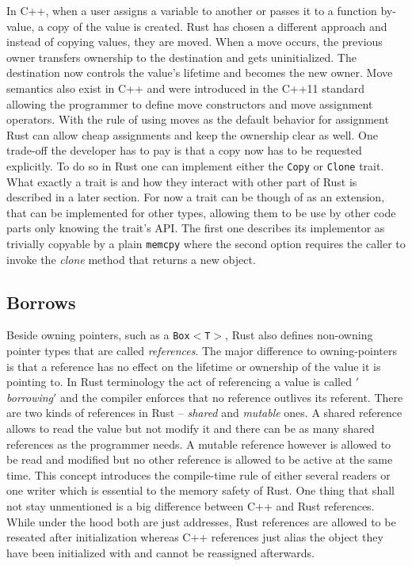 In C++, when a user assigns a variable to another or passes it to a function by-value, a copy of the value is created. Rust has chosen a different approach and instead of copying values, they are moved. When a move occurs,  the previous owner transfers ownership to the destination and gets uninitialized. The destination now controls the value's lifetime and becomes the new owner. Move semantics also exist in C++ and were introduced in the C++11 standard allowing the programmer to define move constructors and move assignment operators. \cite{CppMove} With the rule of using moves as the default behavior for assignment Rust can allow cheap assignments and keep the ownership clear as well. One trade-off the developer has to pay is that a copy now has to be requested explicitly. To do so in Rust one can implement either the \texttt{Copy} or \texttt{Clone} trait. What exactly a trait is and how they interact with other part of Rust is described in a later section. For now a trait can be though of as an extension, that can be implemented for other types, allowing them to be use by other code parts only knowing the trait's \ac{API}. The first one describes its implementor as trivially copyable by a plain \texttt{memcpy} where the second option requires the caller to invoke the \textit{clone} method that returns a new object. \cite[Chapter 4. Ownership]{ProgrammingRust}

\subsection{Borrows}

Beside owning pointers, such as a \texttt{Box$<$T$>$}, Rust also defines non-owning pointer types that are called \textit{references}. The major difference to owning-pointers is that a reference has no effect on the lifetime or ownership of the value it is pointing to. In Rust terminology the act of referencing a value is called \textit{$'$borrowing$'$} and the compiler enforces that no reference outlives its referent. There are two kinds of references in Rust -- \textit{shared} and \textit{mutable} ones. A shared reference allows to read the value but not modify it and there can be as many shared references as the programmer needs. A mutable reference however is allowed to be read and modified but no other reference is allowed to be active at the same time. This concept introduces the compile-time rule of either several readers or one writer which is essential to the memory safety of Rust. One thing that shall not stay unmentioned is a big difference between C++ and Rust references. While under the hood both are just addresses, Rust references are allowed to be reseated after initialization whereas C++ references just alias the object they have been initialized with and cannot be reassigned afterwards. \cite[Chapter 5. References]{ProgrammingRust}

